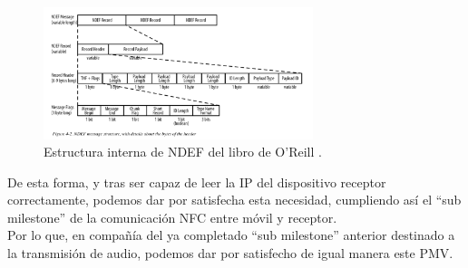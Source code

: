 \begin{figure}[H]
    \centering
    \includegraphics[width=0.7\textwidth]{fotos/estructura_ndef.png}
    \caption{Estructura interna de NDEF del libro de O’Reill \cite{ndef-explicado}.}
\end{figure}

De esta forma, y tras ser capaz de leer la IP del dispositivo receptor
correctamente, podemos dar por satisfecha esta necesidad, cumpliendo así el
``sub milestone'' de la comunicación NFC entre móvil y receptor.\\

Por lo que, en compañía del ya completado ``sub milestone'' anterior destinado a
la transmisión de audio, podemos dar por satisfecho de igual manera este PMV. 